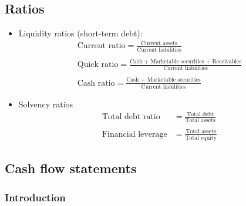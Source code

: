 \documentclass[../notes_compiled.tex]{subfiles}
\begin{document}
\subsection{Ratios}
\begin{itemize}
\item Liquidity ratios (short-term debt):
\begin{gather}
\text{Current ratio} = \frac{\text{Current assets}}{\text{Current liabilities}} \label{currentratio}\\ \\
\text{Quick ratio} = \frac{\text{Cash + Marketable securities + Receivables}}{\text{Current liabilities}} \label{quickratio} \\ \\
\text{Cash ratio} = \frac{\text{Cash + Marketable securities}}{\text{Current liabilities}} \label{cashratio}
\end{gather}

\item Solvency ratios
\begin{align}
\text{Total debt ratio} &= \frac{\text{Total debt}}{\text{Total assets}} \\ \nonumber \\
\text{Financial leverage} &= \frac{\text{Total assets}}{\text{Total equity}}
\end{align}

\end{itemize}


\subsection{Cash flow statements}

\subsubsection{Introduction}
\end{document}
